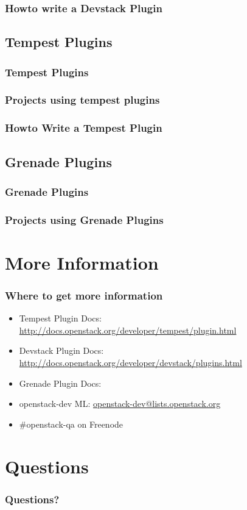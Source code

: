 \documentclass[aspectratio=169,11pt,hyperref={colorlinks=true}]{beamer}
\begin{document}
\begin{frame}
    \frametitle{Howto write a Devstack Plugin}

\end{frame}

\subsection{Tempest Plugins}
\begin{frame}
    \frametitle{Tempest Plugins}
\end{frame}

\begin{frame}
    \frametitle{Projects using tempest plugins}

\end{frame}

\begin{frame}
    \frametitle{Howto Write a Tempest Plugin}

\end{frame}

\subsection{Grenade Plugins}
\begin{frame}
    \frametitle{Grenade Plugins}
\end{frame}

\begin{frame}
\frametitle{Projects using Grenade Plugins}

\end{frame}

\section{More Information}
\begin{frame}
\frametitle{Where to get more information}
    \begin{itemize}
        \item Tempest Plugin Docs: \href{http://docs.openstack.org/developer/tempest/plugin.html}{http://docs.openstack.org/developer/tempest/plugin.html}
        \item Devstack Plugin Docs: \href{http://docs.openstack.org/developer/devstack/plugins.html}{http://docs.openstack.org/developer/devstack/plugins.html}
        \item Grenade Plugin Docs:
        \item openstack-dev ML: \href{mailto:openstack-dev@lists.openstack.org}{openstack-dev@lists.openstack.org}
        \item \#openstack-qa on Freenode
    \end{itemize}
\end{frame}

\section{Questions}
\begin{frame}
\frametitle{Questions?}
\end{frame}

\end{document}
